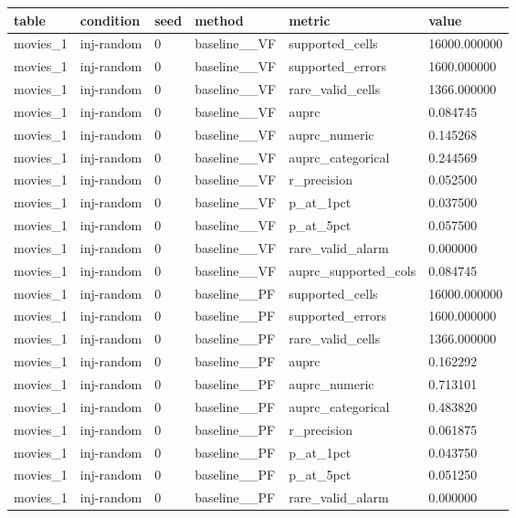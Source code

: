 \begin{tabular}{llllll}
\hline
table & condition & seed & method & metric & value \\
\hline
movies\_1 & inj-random & 0 & baseline\_\_VF & supported\_cells & 16000.000000 \\
movies\_1 & inj-random & 0 & baseline\_\_VF & supported\_errors & 1600.000000 \\
movies\_1 & inj-random & 0 & baseline\_\_VF & rare\_valid\_cells & 1366.000000 \\
movies\_1 & inj-random & 0 & baseline\_\_VF & auprc & 0.084745 \\
movies\_1 & inj-random & 0 & baseline\_\_VF & auprc\_numeric & 0.145268 \\
movies\_1 & inj-random & 0 & baseline\_\_VF & auprc\_categorical & 0.244569 \\
movies\_1 & inj-random & 0 & baseline\_\_VF & r\_precision & 0.052500 \\
movies\_1 & inj-random & 0 & baseline\_\_VF & p\_at\_1pct & 0.037500 \\
movies\_1 & inj-random & 0 & baseline\_\_VF & p\_at\_5pct & 0.057500 \\
movies\_1 & inj-random & 0 & baseline\_\_VF & rare\_valid\_alarm & 0.000000 \\
movies\_1 & inj-random & 0 & baseline\_\_VF & auprc\_supported\_cols & 0.084745 \\
movies\_1 & inj-random & 0 & baseline\_\_PF & supported\_cells & 16000.000000 \\
movies\_1 & inj-random & 0 & baseline\_\_PF & supported\_errors & 1600.000000 \\
movies\_1 & inj-random & 0 & baseline\_\_PF & rare\_valid\_cells & 1366.000000 \\
movies\_1 & inj-random & 0 & baseline\_\_PF & auprc & 0.162292 \\
movies\_1 & inj-random & 0 & baseline\_\_PF & auprc\_numeric & 0.713101 \\
movies\_1 & inj-random & 0 & baseline\_\_PF & auprc\_categorical & 0.483820 \\
movies\_1 & inj-random & 0 & baseline\_\_PF & r\_precision & 0.061875 \\
movies\_1 & inj-random & 0 & baseline\_\_PF & p\_at\_1pct & 0.043750 \\
movies\_1 & inj-random & 0 & baseline\_\_PF & p\_at\_5pct & 0.051250 \\
movies\_1 & inj-random & 0 & baseline\_\_PF & rare\_valid\_alarm & 0.000000 \\

\end{tabular}
